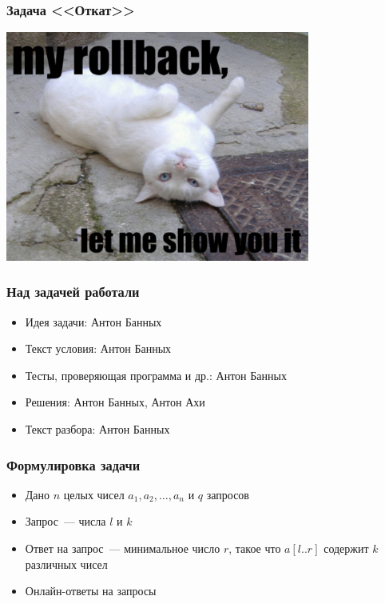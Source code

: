 
\begin{frame}
  \frametitle{Задача <<Откат>>}
  \begin{center}
    \includegraphics[width=10cm]{rollback.eps}
  \end{center}
\end{frame}

\begin{frame}
  \frametitle{Над задачей работали}
  \begin{itemize}
    \item Идея задачи: Антон Банных
    \item Текст условия: Антон Банных
    \item Тесты, проверяющая программа и др.: Антон Банных
    \item Решения: Антон Банных, Антон Ахи
    \item Текст разбора: Антон Банных
  \end{itemize}
\end{frame}

\begin{frame}
  \frametitle{Формулировка задачи}
  \begin{itemize}
    \item Дано $n$ целых чисел $a_1, a_2, \ldots, a_n$ и $q$ запросов
    \item Запрос~--- числа $l$ и $k$
    \item Ответ на запрос~--- минимальное число $r$, такое что $a[l..r]$ содержит $k$ различных чисел
    \item Онлайн-ответы на запросы
  \end{itemize}
\end{frame}

